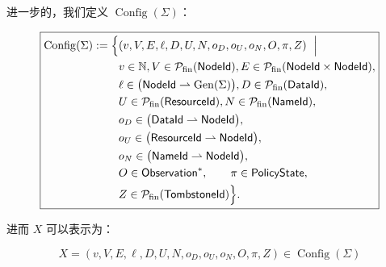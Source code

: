 进一步的，我们定义 $\operatorname{Config}(\Sigma)$：

\begin{equation}
  \boxed{
    \begin{aligned}
      \operatorname{Config}(\Sigma)
      :=
      \Bigl\{
        &
        (v,V,E,\ell,D,U,N,
        o_D,o_U,o_N,O,\pi,Z)
        \ \Bigm|\
        \\
        &
        v\in\mathbb N,V\in\mathcal P_{\mathrm{fin}}(\mathsf{NodeId}),E\in
        \mathcal P_{\mathrm{fin}}
        (\mathsf{NodeId}\times\mathsf{NodeId}),
        \\
        &
        \ell\in
        \bigl(
          \mathsf{NodeId}
          \rightharpoonup
          \operatorname{Gen}(\Sigma)
        \bigr),D\in\mathcal P_{\mathrm{fin}}(\mathsf{DataId}),
        \\
        &
        U\in\mathcal P_{\mathrm{fin}}(\mathsf{ResourceId}),N\in\mathcal P_{\mathrm{fin}}(\mathsf{NameId}),
        \\
        &
        o_D\in
        \bigl(
          \mathsf{DataId}
          \rightharpoonup
          \mathsf{NodeId}
        \bigr),
        \\
        &
        o_U\in
        \bigl(
          \mathsf{ResourceId}
          \rightharpoonup
          \mathsf{NodeId}
        \bigr),
        \\
        &
        o_N\in
        \bigl(
          \mathsf{NameId}
          \rightharpoonup
          \mathsf{NodeId}
        \bigr),
        \\
        &
        O\in\mathsf{Observation}^{*},
        \qquad
        \pi\in\mathsf{PolicyState},
        \\
        &
        Z\in\mathcal P_{\mathrm{fin}}(\mathsf{TombstoneId})
      \Bigr\}.
  \end{aligned}}\label{eq:definition-of-config-sigma}
\end{equation}

进而 $X$ 可以表示为：

\begin{equation}
  \boxed{X=
    (v,V,E,\ell,D,U,N,
  o_D,o_U,o_N,O,\pi,Z) \in \operatorname{Config}(\Sigma) }\label{eq:definition-of-x-detail}
\end{equation}

